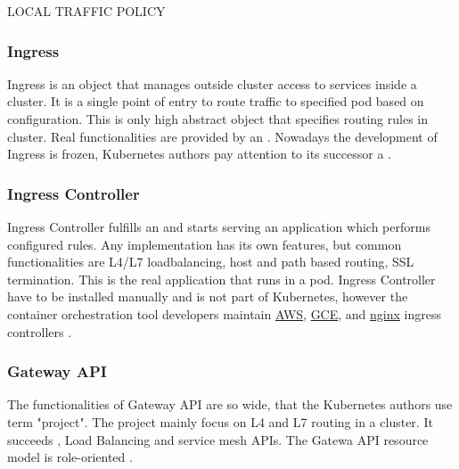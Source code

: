 LOCAL TRAFFIC POLICY

\subsubsection{Ingress}
\label{ingress}

Ingress is an object that manages outside cluster access to services inside a cluster. It is a single point of entry to route traffic to specified pod based on configuration. This is only high abstract object that specifies routing rules in cluster. Real functionalities are provided by an \textit{}. Nowadays the development of Ingress is frozen, Kubernetes authors pay attention to its successor a \textit{} \cite{KubernetesIngress}.

\subsubsection{Ingress Controller}
\label{ingresscontroller}

Ingress Controller fulfills an \textit{} and starts serving an application which performs configured rules. Any implementation has its own features, but common functionalities are L4/L7 loadbalancing, host and path based routing, SSL termination. This is the real application that runs in a pod. Ingress Controller have to be installed manually and is not part of Kubernetes, however the container orchestration tool developers maintain \href{https://github.com/kubernetes-sigs/aws-load-balancer-controller#readme}{AWS}, \href{https://github.com/kubernetes/ingress-gce/blob/master/README.md#readme}{GCE}, and \href{https://github.com/kubernetes/ingress-nginx/blob/main/README.md#readme}{nginx} ingress controllers \cite{KubernetesIngress}\cite{KubernetesIngressControllers}.

\subsubsection{Gateway API}
\label{gatewayapi}

The functionalities of Gateway API are so wide, that the Kubernetes authors use term "project". The project mainly focus on L4 and L7 routing in a cluster. It succeeds \textit{}, Load Balancing and service mesh APIs. The Gatewa API resource model is role-oriented \cite{KubernetesGatewayAPI}.

